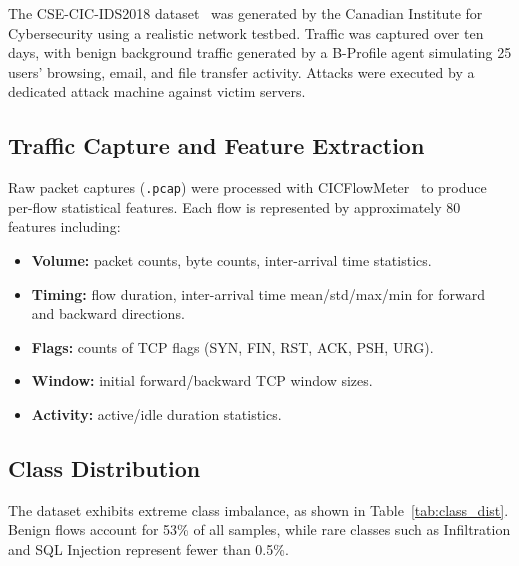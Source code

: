 \documentclass[12pt]{article}
\theoremstyle{plain}
\begin{document}
The CSE-CIC-IDS2018 dataset~\cite{cic2018} was generated by the Canadian Institute for Cybersecurity using a realistic network testbed. Traffic was captured over ten days, with benign background traffic generated by a B-Profile agent simulating 25 users' browsing, email, and file transfer activity. Attacks were executed by a dedicated attack machine against victim servers.

\subsection{Traffic Capture and Feature Extraction}

Raw packet captures (\texttt{.pcap}) were processed with CICFlowMeter~\cite{cicflowmeter} to produce per-flow statistical features. Each flow is represented by approximately 80 features including:
\begin{itemize}
  \item \textbf{Volume:} packet counts, byte counts, inter-arrival time statistics.
  \item \textbf{Timing:} flow duration, inter-arrival time mean/std/max/min for forward and backward directions.
  \item \textbf{Flags:} counts of TCP flags (SYN, FIN, RST, ACK, PSH, URG).
  \item \textbf{Window:} initial forward/backward TCP window sizes.
  \item \textbf{Activity:} active/idle duration statistics.
\end{itemize}

\subsection{Class Distribution}

The dataset exhibits extreme class imbalance, as shown in Table~\ref{tab:class_dist}. Benign flows account for 53\% of all samples, while rare classes such as Infiltration and SQL Injection represent fewer than 0.5\%.
\end{document}
